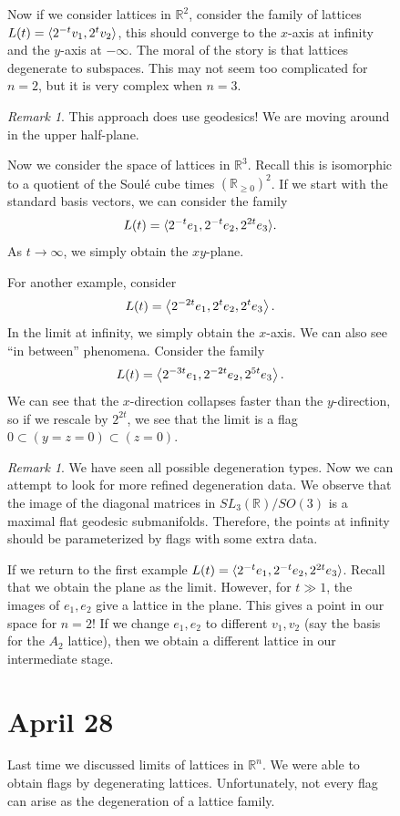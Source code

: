 \documentclass[leqno, openany]{memoir}
\DeclarePairedDelimiter{\gen}{\langle}{\rangle}
\theoremstyle{definition}
\theoremstyle{remark}
\newtheorem{rmk}[thm]{Remark}
\theoremstyle{plain}
\theoremstyle{definition}
\theoremstyle{remark}
\newcommand{\R}{\mathbb{R}}
\begin{document}
\begin{figure}[H]
Now if we consider lattices in $\R^2$, consider the family of lattices $L(t) =
\ev{2^{-t} v_1, 2^t v_2}$, this should converge to the $x$-axis at infinity and
the $y$-axis at $-\infty$. The moral of the story is that lattices degenerate
to subspaces. This may not seem too complicated for $n=2$, but it is very
complex when $n=3$.

\begin{rmk} This approach does use geodesics! We are moving around in the upper
half-plane.  \end{rmk}

Now we consider the space of lattices in $\R^3$. Recall this is isomorphic to a
quotient of the Soul\'e cube times $(\R_{\geq 0})^2$. If we start with the
standard basis vectors, we can consider the family \[ L(t) = \gen{2^{-t} e_1,
2^{-t}e_2, 2^{2t}e_3}.\] As $t \to \infty$, we simply obtain the $xy$-plane.

For another example, consider \[ L(t) = \ev{2^{-2t}e_1, 2^t e_2, 2^t e_3} .\]
In the limit at infinity, we simply obtain the $x$-axis. We can also see ``in
between'' phenomena. Consider the family \[ L(t) = \ev{2^{-3t}e_1, 2^{-2t} e_2,
2^{5t} e_3}. \] We can see that the $x$-direction collapses faster than the
$y$-direction, so if we rescale by $2^{2t}$, we see that the limit is a flag $0
\subset (y=z=0) \subset (z=0)$. 

\begin{rmk} We have seen all possible degeneration types. Now we can attempt to
    look for more refined degeneration data. We observe that the image of the
    diagonal matrices in $SL_3(\R) / SO(3)$ is a maximal flat geodesic
    submanifolds. Therefore, the points at infinity should be parameterized by
    flags with some extra data.  \end{rmk}

If we return to the first example $L(t) = \gen{2^{-t}e_1, 2^{-t}e_2,
2^{2t}e_3}$. Recall that we obtain the plane as the limit. However, for $t \gg
1$, the images of $e_1, e_2$ give a lattice in the plane. This gives a point in
our space for $n=2$! If we change $e_1,e_2$ to different $v_1,v_2$ (say the
basis for the $A_2$ lattice), then we obtain a different lattice in our
intermediate stage.

\chapter{April 28}%

Last time we discussed limits of lattices in $\R^n$. We were able to obtain
flags by degenerating lattices. Unfortunately, not every flag can arise as the
degeneration of a lattice family.


\end{figure}
\end{document}
